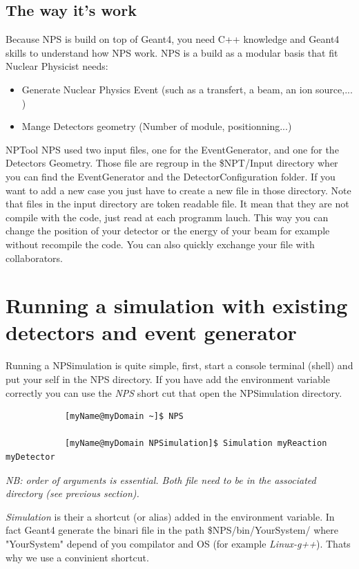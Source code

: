 \documentclass{book}
\begin{document}
\subsection{ The way it's work }

Because NPS is build on top of Geant4, you need C++ knowledge and Geant4 skills to understand how NPS work. NPS is a build as a modular basis that fit Nuclear Physicist needs: 
	\begin{itemize}
		\item Generate Nuclear Physics Event (such as a transfert, a beam, an ion source,... ) 
		\item Mange Detectors geometry (Number of module, positionning...)
	\end{itemize}
NPTool
NPS used two input files, one for the EventGenerator, and one for the Detectors Geometry. Those file are regroup in the \$NPT/Input directory wher you can find the EventGenerator and the DetectorConfiguration folder. If you want to add a new case you just have to create a new file in those directory. Note that files in the input directory are token readable file. It mean that they are not compile with the code, just read at each programm lauch. This way you can change the position of your detector or the energy of your beam for example without recompile the code. You can also quickly exchange your file with collaborators.

\section{ Running a simulation with existing detectors and event generator }

Running a NPSimulation is quite simple, first, start a console terminal (shell) and put your self in the NPS directory. If you have add the environment variable correctly you can use the \emph{NPS} short cut that open the NPSimulation directory.
	
	\begin{verbatim}
			[myName@myDomain ~]$ NPS
			
			[myName@myDomain NPSimulation]$ Simulation myReaction myDetector
	\end{verbatim}
	
\emph{NB: order of arguments is essential. Both file need to be in the associated directory (see previous section).}

\emph{Simulation} is their a shortcut (or alias) added in the environment variable. In fact Geant4 generate the binari file in the path \$NPS/bin/YourSystem/ where "YourSystem" depend of you compilator and OS (for example \emph{Linux-g++}). Thats why we use a convinient shortcut.
\end{document}
